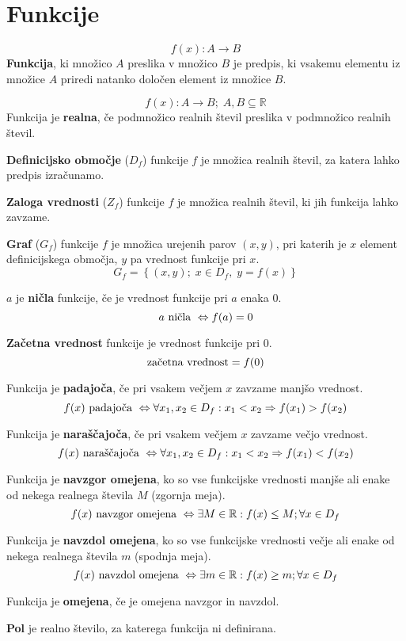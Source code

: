 \documentclass[a4paper,oneside,12pt,fleqn]{article}
\def\R{\ensuremath{\mathbb R}}
\renewcommand\implies\Rightarrow
\renewcommand\iff\Leftrightarrow
\numberwithin{equation}{section}
\begin{document}
\section{Funkcije}
\label{sec:fun}
\[ f(x)\!: A \rightarrow B \]
\textbf{Funkcija}, ki množico $A$ preslika v množico $B$ je predpis, ki vsakemu elementu iz množice
$A$ priredi natanko določen element iz množice $B$.

\[ f(x)\!: A \rightarrow B; \; A, B \subseteq \R \]
Funkcija je \textbf{realna}, če podmnožico realnih števil preslika v podmnožico realnih števil.

\textbf{Definicijsko območje} ($D_f$) funkcije $f$ je množica realnih števil, za katera lahko
predpis izračunamo.

\textbf{Zaloga vrednosti} ($Z_f$) funkcije $f$ je množica realnih števil, ki jih funkcija lahko
zavzame.

\textbf{Graf} ($G_f$) funkcije $f$ je množica urejenih parov $(x, y)$, pri katerih je $x$ element
definicijskega območja, $y$ pa vrednost funkcije pri $x$.
\[ G_f = \left\{ (x,y); \; x \in D_f, \; y = f(x) \right\} \]

$a$ je \textbf{ničla} funkcije, če je vrednost funkcije pri $a$ enaka 0.
\[ a \textnormal{ ničla } \iff f(a) = 0 \]

\textbf{Začetna vrednost} funkcije je vrednost funkcije pri 0.
\[ \textnormal{začetna vrednost} = f(0) \]

Funkcija je \textbf{padajoča}, če pri vsakem večjem $x$ zavzame manjšo vrednost.
\[ f(x) \textnormal{ padajoča } \iff \forall x_1, x_2 \in D_f: x_1 < x_2 \implies f(x_1) >
f(x_2) \]

Funkcija je \textbf{naraščajoča}, če pri vsakem večjem $x$ zavzame večjo vrednost.
\[ f(x) \textnormal{ naraščajoča } \iff \forall x_1, x_2 \in D_f: x_1 < x_2 \implies f(x_1) <
f(x_2) \]

Funkcija je \textbf{navzgor omejena}, ko so vse funkcijske vrednosti manjše ali enake od nekega
realnega števila $M$ (zgornja meja).
\[ f(x) \textnormal{ navzgor omejena } \iff \exists M \in \R: f(x) \leq M; \forall x \in D_f \]


Funkcija je \textbf{navzdol omejena}, ko so vse funkcijske vrednosti večje ali enake od nekega
realnega števila $m$ (spodnja meja).
\[ f(x) \textnormal{ navzdol omejena } \iff \exists m \in \R: f(x) \geq m; \forall x \in D_f \]

Funkcija je \textbf{omejena}, če je omejena navzgor in navzdol.

\textbf{Pol} je realno število, za katerega funkcija ni definirana. 
\end{document}
